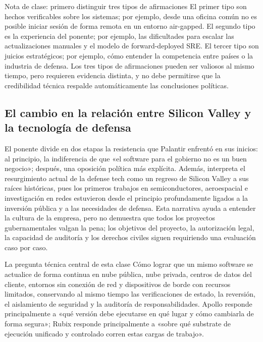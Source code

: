 \documentclass[a4paper]{article}
\begin{document}
\begin{knowledgebox}{Nota de clase: primero distinguir tres tipos de afirmaciones}
El primer tipo son hechos verificables sobre los sistemas; por ejemplo, desde una oficina común no es posible iniciar sesión de forma remota en un entorno air-gapped. El segundo tipo es la experiencia del ponente; por ejemplo, las dificultades para escalar las actualizaciones manuales y el modelo de forward-deployed SRE. El tercer tipo son juicios estratégicos; por ejemplo, cómo entender la competencia entre países o la industria de defensa. Los tres tipos de afirmaciones pueden ser valiosos al mismo tiempo, pero requieren evidencia distinta, y no debe permitirse que la credibilidad técnica respalde automáticamente las conclusiones políticas.
\end{knowledgebox}

\subsection{El cambio en la relación entre Silicon Valley y la tecnología de defensa}

El ponente divide en dos etapas la resistencia que Palantir enfrentó en sus inicios: al principio, la indiferencia de que «el software para el gobierno no es un buen negocio»; después, una oposición política más explícita. Además, interpreta el resurgimiento actual de la defense tech como un regreso de Silicon Valley a sus raíces históricas, pues los primeros trabajos en semiconductores, aeroespacial e investigación en redes estuvieron desde el principio profundamente ligados a la inversión pública y a las necesidades de defensa. Esta narrativa ayuda a entender la cultura de la empresa, pero no demuestra que todos los proyectos gubernamentales valgan la pena; los objetivos del proyecto, la autorización legal, la capacidad de auditoría y los derechos civiles siguen requiriendo una evaluación caso por caso.

\begin{importantbox}{La pregunta técnica central de esta clase}
Cómo lograr que un mismo software se actualice de forma continua en nube pública, nube privada, centros de datos del cliente, entornos sin conexión de red y dispositivos de borde con recursos limitados, conservando al mismo tiempo las verificaciones de estado, la reversión, el aislamiento de seguridad y la auditoría de responsabilidades. Apollo responde principalmente a «qué versión debe ejecutarse en qué lugar y cómo cambiarla de forma segura»; Rubix responde principalmente a «sobre qué substrate de ejecución unificado y controlado corren estas cargas de trabajo».
\end{importantbox}
\end{document}

